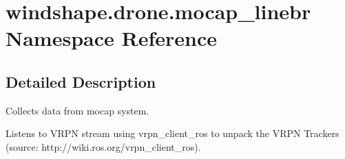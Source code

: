 \hypertarget{namespacewindshape_1_1drone_1_1mocap__linebr}{}\section{windshape.\+drone.\+mocap\+\_\+linebr Namespace Reference}
\label{namespacewindshape_1_1drone_1_1mocap__linebr}


\subsection{Detailed Description}
\begin{DoxyVerb}Collects data from mocap system.

Listens to VRPN stream using vrpn_client_ros to unpack the VRPN Trackers
(source: http://wiki.ros.org/vrpn_client_ros).
\end{DoxyVerb}
 
